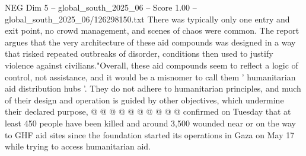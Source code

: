 \begin{textsample}{NEG Dim 5 – global\_south\_2025\_06 – Score 1.00 – global\_south\_2025\_06/126298150.txt}
There was typically only one entry and exit point, no crowd management, and scenes of chaos were common.
The report argues that the very architecture of these aid compounds was designed in a way that risked repeated outbreaks of disorder, conditions then used to justify violence against civilians."Overall, these aid compounds seem to reflect a logic of control, not assistance, and it would be a misnomer to call them ' humanitarian aid distribution hubs '.
They do not adhere to humanitarian principles, and much of their design and operation is guided by other objectives, which undermine their declared purpose, @ @ @ @ @ @ @ @ @ @ confirmed on Tuesday that at least 450 people have been killed and around 3,500 wounded near or on the way to GHF aid sites since the foundation started its operations in Gaza on May 17 while trying to access humanitarian aid.

\end{textsample}
